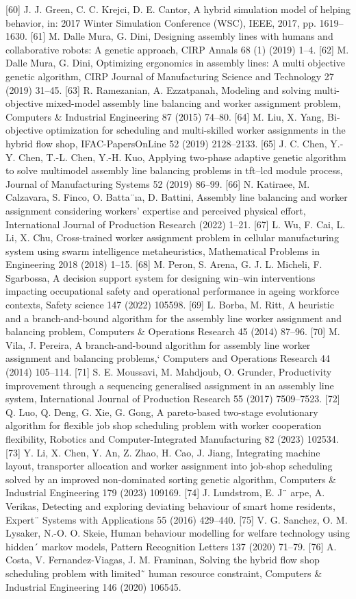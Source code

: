 [60]	J. J. Green, C. C. Krejci, D. E. Cantor, A hybrid simulation model of helping behavior, in: 2017 Winter Simulation Conference (WSC), IEEE, 2017, pp. 1619–1630.
[61]	M. Dalle Mura, G. Dini, Designing assembly lines with humans and collaborative robots: A genetic approach,
CIRP Annals 68 (1) (2019) 1–4.
[62]	M. Dalle Mura, G. Dini, Optimizing ergonomics in assembly lines: A multi objective genetic algorithm, CIRP
Journal of Manufacturing Science and Technology 27 (2019) 31–45.
[63]	R. Ramezanian, A. Ezzatpanah, Modeling and solving multi-objective mixed-model assembly line balancing and worker assignment problem, Computers & Industrial Engineering 87 (2015) 74–80.
[64]	M. Liu, X. Yang, Bi-objective optimization for scheduling and multi-skilled worker assignments in the hybrid flow shop, IFAC-PapersOnLine 52 (2019) 2128–2133.
[65]	J. C. Chen, Y.-Y. Chen, T.-L. Chen, Y.-H. Kuo, Applying two-phase adaptive genetic algorithm to solve multimodel assembly line balancing problems in tft–lcd module process, Journal of Manufacturing Systems 52 (2019) 86–99.
[66]	N. Katiraee, M. Calzavara, S. Finco, O. Batta¨ıa, D. Battini, Assembly line balancing and worker assignment considering workers’ expertise and perceived physical effort, International Journal of Production Research (2022) 1–21.
[67]	L. Wu, F. Cai, L. Li, X. Chu, Cross-trained worker assignment problem in cellular manufacturing system using swarm intelligence metaheuristics, Mathematical Problems in Engineering 2018 (2018) 1–15.
[68]	M. Peron, S. Arena, G. J. L. Micheli, F. Sgarbossa, A decision support system for designing win–win interventions impacting occupational safety and operational performance in ageing workforce contexts, Safety science 147 (2022) 105598.
[69]	L. Borba, M. Ritt, A heuristic and a branch-and-bound algorithm for the assembly line worker assignment and balancing problem, Computers & Operations Research 45 (2014) 87–96.
[70]	M. Vila, J. Pereira, A branch-and-bound algorithm for assembly line worker assignment and balancing problems,`
Computers and Operations Research 44 (2014) 105–114.
[71]	S. E. Moussavi, M. Mahdjoub, O. Grunder, Productivity improvement through a sequencing generalised assignment in an assembly line system, International Journal of Production Research 55 (2017) 7509–7523.
[72]	Q. Luo, Q. Deng, G. Xie, G. Gong, A pareto-based two-stage evolutionary algorithm for flexible job shop scheduling problem with worker cooperation flexibility, Robotics and Computer-Integrated Manufacturing 82 (2023) 102534.
[73]	Y. Li, X. Chen, Y. An, Z. Zhao, H. Cao, J. Jiang, Integrating machine layout, transporter allocation and worker assignment into job-shop scheduling solved by an improved non-dominated sorting genetic algorithm, Computers & Industrial Engineering 179 (2023) 109169.
[74]	J. Lundstrom, E. J¨	arpe, A. Verikas, Detecting and exploring deviating behaviour of smart home residents, Expert¨
Systems with Applications 55 (2016) 429–440.
[75]	V. G. Sanchez, O. M. Lysaker, N.-O. O. Skeie, Human behaviour modelling for welfare technology using hidden´ markov models, Pattern Recognition Letters 137 (2020) 71–79.
[76]	A. Costa, V. Fernandez-Viagas, J. M. Framinan, Solving the hybrid flow shop scheduling problem with limited˜ human resource constraint, Computers & Industrial Engineering 146 (2020) 106545.
